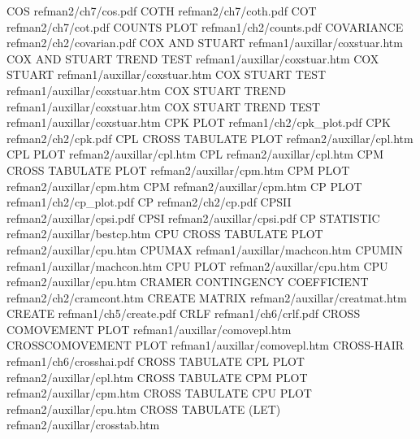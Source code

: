 COS                                     refman2/ch7/cos.pdf
COTH                                    refman2/ch7/coth.pdf
COT                                     refman2/ch7/cot.pdf
COUNTS PLOT                             refman1/ch2/counts.pdf
COVARIANCE                              refman2/ch2/covarian.pdf
COX AND STUART                          refman1/auxillar/coxstuar.htm
COX AND STUART TREND TEST               refman1/auxillar/coxstuar.htm
COX STUART                              refman1/auxillar/coxstuar.htm
COX STUART TEST                         refman1/auxillar/coxstuar.htm
COX STUART TREND                        refman1/auxillar/coxstuar.htm
COX STUART TREND TEST                   refman1/auxillar/coxstuar.htm
CPK PLOT                                refman1/ch2/cpk_plot.pdf
CPK                                     refman2/ch2/cpk.pdf
CPL CROSS TABULATE PLOT                 refman2/auxillar/cpl.htm
CPL PLOT                                refman2/auxillar/cpl.htm
CPL                                     refman2/auxillar/cpl.htm
CPM CROSS TABULATE PLOT                 refman2/auxillar/cpm.htm
CPM PLOT                                refman2/auxillar/cpm.htm
CPM                                     refman2/auxillar/cpm.htm
CP PLOT                                 refman1/ch2/cp_plot.pdf
CP                                      refman2/ch2/cp.pdf
CPSII                                   refman2/auxillar/cpsi.pdf
CPSI                                    refman2/auxillar/cpsi.pdf
CP STATISTIC                            refman2/auxillar/bestcp.htm
CPU CROSS TABULATE PLOT                 refman2/auxillar/cpu.htm
CPUMAX                                  refman1/auxillar/machcon.htm
CPUMIN                                  refman1/auxillar/machcon.htm
CPU PLOT                                refman2/auxillar/cpu.htm
CPU                                     refman2/auxillar/cpu.htm
CRAMER CONTINGENCY COEFFICIENT          refman2/ch2/cramcont.htm
CREATE MATRIX                           refman2/auxillar/creatmat.htm
CREATE                                  refman1/ch5/create.pdf
CRLF                                    refman1/ch6/crlf.pdf
CROSS COMOVEMENT PLOT                   refman1/auxillar/comovepl.htm
CROSSCOMOVEMENT PLOT                    refman1/auxillar/comovepl.htm
CROSS-HAIR                              refman1/ch6/crosshai.pdf
CROSS TABULATE CPL PLOT                 refman2/auxillar/cpl.htm
CROSS TABULATE CPM PLOT                 refman2/auxillar/cpm.htm
CROSS TABULATE CPU PLOT                 refman2/auxillar/cpu.htm
CROSS TABULATE (LET)                    refman2/auxillar/crosstab.htm
